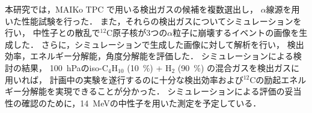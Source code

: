 \documentclass[./master]{subfiles}
\begin{document}
  本研究では，MAIKo TPC で用いる検出ガスの候補を複数選出し，
  $\alpha$線源を用いた性能試験を行った．
  また，それらの検出ガスについてシミュレーションを行い，
  中性子との散乱で${}^{12}\mathrm{C}$原子核が3つの$\alpha$粒子に崩壊するイベントの画像を生成した．
  さらに，シミュレーションで生成した画像に対して解析を行い，
  検出効率，エネルギー分解能，角度分解能を評価した．
  シミュレーションによる検討の結果，
  \SI{100}{\hecto\pascal}のiso-$\mathrm{C}_{4}\mathrm{H}_{10}$ (\SI{10}{\percent}) +
  $\mathrm{H}_{2}$ (\SI{90}{\percent}) の混合ガスを検出ガスに用いれば，
  計画中の実験を遂行するのに十分な検出効率および${}^{12}\mathrm{C}$の励起エネルギー分解能を実現できることが分かった．
  シミュレーションによる評価の妥当性の確認のために，\SI{14}{\mega\electronvolt}の中性子を用いた測定を予定している．
\end{document}
